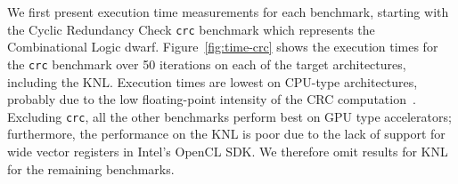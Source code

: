 \documentclass[../document.tex]{subfiles}
\begin{document}
\label{ssec:time}
	
We first present execution time measurements for each benchmark, starting with the Cyclic Redundancy Check {\tt crc} benchmark which represents the Combinational Logic dwarf.
Figure~\ref{fig:time-crc} shows the execution times for the {\tt crc} benchmark over 50 iterations on each of the target architectures, including the KNL.
Execution times are lowest on CPU-type architectures, probably due to the low floating-point intensity of the CRC computation~\cite[Ch. 6]{joshi2016thesis}.
Excluding {\tt crc}, all the other benchmarks perform best on GPU type accelerators; furthermore, the performance on the KNL is poor due to the lack of support for wide vector registers in Intel's OpenCL SDK.
We therefore omit results for KNL for the remaining benchmarks.

\newcommand{\plotwidth}{0.24\textwidth}
\end{document}
